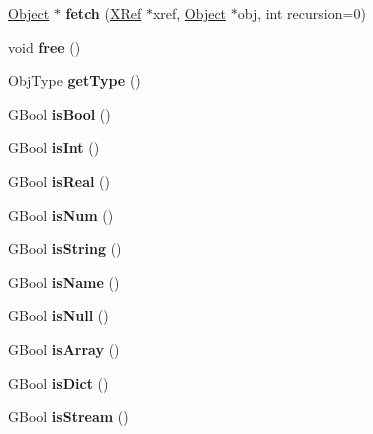 \begin{DoxyCompactItemize}
\hyperlink{class_object}{Object} $\ast$ {\bfseries fetch} (\hyperlink{class_x_ref}{X\+Ref} $\ast$xref, \hyperlink{class_object}{Object} $\ast$obj, int recursion=0)
\item 
\mbox{\label{class_object_a61b870f752e22d5274bd5a6bd05a2fd9}} 
void {\bfseries free} ()
\item 
\mbox{\label{class_object_a9cbe0e20495994b832f2295045a30194}} 
Obj\+Type {\bfseries get\+Type} ()
\item 
\mbox{\label{class_object_afe365344957d9e4c11629e8c07f225ab}} 
G\+Bool {\bfseries is\+Bool} ()
\item 
\mbox{\label{class_object_a9599c90a762e7e132fbee67048b96ad7}} 
G\+Bool {\bfseries is\+Int} ()
\item 
\mbox{\label{class_object_a4945e87e956de9f0bce31c6a6cca0ec3}} 
G\+Bool {\bfseries is\+Real} ()
\item 
\mbox{\label{class_object_a2c9d3287af9f3ba5c46d786f13e3414d}} 
G\+Bool {\bfseries is\+Num} ()
\item 
\mbox{\label{class_object_abeb2ee92f42bee464ed184bde6689a4f}} 
G\+Bool {\bfseries is\+String} ()
\item 
\mbox{\label{class_object_a5a848cee0d4c22327ca6080ac8595f37}} 
G\+Bool {\bfseries is\+Name} ()
\item 
\mbox{\label{class_object_aef4d3ed0776d25964cad50056e39495a}} 
G\+Bool {\bfseries is\+Null} ()
\item 
\mbox{\label{class_object_aaf22f30c315d896dc5365ab02aa45856}} 
G\+Bool {\bfseries is\+Array} ()
\item 
\mbox{\label{class_object_a0bf0eecdf75301ba2a5459e9d3cd4e32}} 
G\+Bool {\bfseries is\+Dict} ()
\item 
\mbox{\label{class_object_a6a9b67de39cd67a9d59a925d8325666b}} 
G\+Bool {\bfseries is\+Stream} ()
\item 

\end{DoxyCompactItemize}
